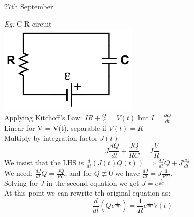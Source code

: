 \documentclass[11pt]{article}
\theoremstyle{definition}
\begin{document}
\begin{center}
    {\LARGE 27th September}\\
\end{center}
\textit{Eg:} C-R circuit\\
\includegraphics[width=0.5\textwidth]{RC.png}\\
Applying Kitchoff's Law: $IR + \frac{Q}{C} = V(t)$ but $I = \frac{dQ}{dt}$\\
Linear for V = V(t), separable if $V(t) = K$\\
Multiply by integration factor $J(t)$ \\
$$J\frac{dQ}{dt} + \frac{JQ}{RC} = J\frac{V}{R}$$
We insist that the LHS is $\frac{d}{dt}(J(t)Q(t)) \implies \frac{dJ}{dt}Q + J\frac{dQ}{dt}$\\
We need: $\frac{dJ}{dt}Q = \frac{JQ}{RC}$, and for $Q \not\equiv 0$ we have $\frac{dJ}{dt} = J\frac{1}{RC}$.\\
Solving for $J$ in the second equation we get $J = e^{\frac{t}{RC}}$\\
At this point we can rewrite teh original equation as:
$$\frac{d}{dt}(Qe^{\frac{t}{RC}}) = \frac{1}{R}e^{\frac{t}{RC}}V(t)$$
\end{document}
